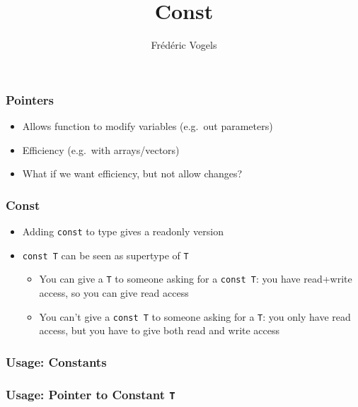 \usepackage{../pvm}
\usetikzlibrary{shadows,shapes.multipart}

\title{Const}
\author{Fr\'ed\'eric Vogels}





\begin{frame}
  \titlepage
\end{frame}

\begin{frame}
  \frametitle{Pointers}
  \begin{itemize}
    \item Allows function to modify variables (e.g.\ out parameters)
    \item Efficiency (e.g.\ with arrays/vectors)
  \end{itemize}
  \vskip5mm
  \begin{itemize}
    \item What if we want efficiency, but not allow changes?
  \end{itemize}
\end{frame}

\begin{frame}
  \frametitle{Const}
  \begin{itemize}
    \item Adding {\tt const} to type gives a readonly version
    \item {\tt const T} can be seen as supertype of {\tt T}
      \begin{itemize}
        \item You can give a {\tt T} to someone asking for a {\tt const T}:
              you have read+write access, so you can give read access
        \item You can't give a {\tt const T} to someone asking for a {\tt T}:
              you only have read access, but you have to give both read and write access
      \end{itemize}
  \end{itemize}
\end{frame}

\begin{frame}
  \frametitle{Usage: Constants}
\end{frame}

\begin{frame}
  \frametitle{Usage: Pointer to Constant {\tt T}}
\end{frame}

